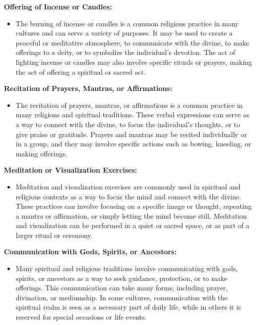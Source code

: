 \textbf{Offering of Incense or Candles:}

\begin{itemize}
\tightlist
\item
  The burning of incense or candles is a common religious practice in
  many cultures and can serve a variety of purposes. It may be used to
  create a peaceful or meditative atmosphere, to communicate with the
  divine, to make offerings to a deity, or to symbolize the individual's
  devotion. The act of lighting incense or candles may also involve
  specific rituals or prayers, making the act of offering a spiritual or
  sacred act.
\end{itemize}

\textbf{Recitation of Prayers, Mantras, or Affirmations:}

\begin{itemize}
\tightlist
\item
  The recitation of prayers, mantras, or affirmations is a common
  practice in many religions and spiritual traditions. These verbal
  expressions can serve as a way to connect with the divine, to focus
  the individual's thoughts, or to give praise or gratitude. Prayers and
  mantras may be recited individually or in a group, and they may
  involve specific actions such as bowing, kneeling, or making
  offerings.
\end{itemize}

\textbf{Meditation or Visualization Exercises:}

\begin{itemize}
\tightlist
\item
  Meditation and visualization exercises are commonly used in spiritual
  and religious contexts as a way to focus the mind and connect with the
  divine. These practices can involve focusing on a specific image or
  thought, repeating a mantra or affirmation, or simply letting the mind
  become still. Meditation and visualization can be performed in a quiet
  or sacred space, or as part of a larger ritual or ceremony.
\end{itemize}

\textbf{Communication with Gods, Spirits, or Ancestors:}

\begin{itemize}
\tightlist
\item
  Many spiritual and religious traditions involve communicating with
  gods, spirits, or ancestors as a way to seek guidance, protection, or
  to make offerings. This communication can take many forms, including
  prayer, divination, or mediumship. In some cultures, communication
  with the spiritual realm is seen as a necessary part of daily life,
  while in others it is reserved for special occasions or life events.
\end{itemize}

